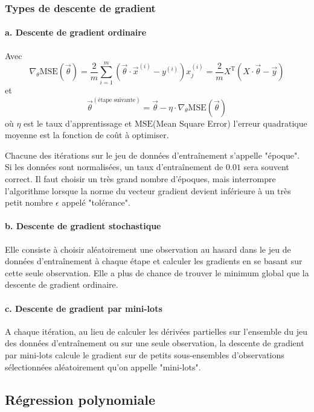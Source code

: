 \documentclass[a4paper,12pt,twoside]{report}
\theoremstyle{definition}
\theoremstyle{plain}
\theoremstyle{remark}
\begin{document}
\subsubsection{Types de descente de gradient}

\paragraph{a. Descente de gradient ordinaire}

Avec
\[ \nabla_\theta \mathrm{MSE}(\vec{\theta}) = \frac{2}{m} \sum_{i=1}^{m} (\vec{\theta} \cdot \vec{x}^{(i)} - y^{(i)}) x_j^{(i)} = \frac{2}{m} X^{\mathrm{T}} (X \cdot \vec{\theta} - \vec{y}) \]
et
\[ \vec{\theta}^{(\text{étape suivante})} = \vec{\theta} - \eta \cdot \nabla_\theta \mathrm{MSE}(\vec{\theta}) \]
où $\eta$ est le taux d'apprentissage et $\mathrm{MSE}$(Mean Square Error) l'erreur quadratique moyenne est la fonction de coût à optimiser.

Chacune des itérations sur le jeu de données d'entraînement s'appelle "époque". Si les données sont normalisées, un taux d'entraînement de $0.01$ sera souvent correct. Il faut choisir un très grand nombre d'époques, mais interrompre l'algorithme lorsque la norme du vecteur gradient devient inférieure à un très petit nombre $\epsilon$ appelé "tolérance".

\paragraph{b. Descente de gradient stochastique}

Elle consiste à choisir aléatoirement une observation au hasard dans le jeu de données d'entraînement à chaque étape et calculer les gradients en se basant sur cette seule observation. Elle a plus de chance de trouver le minimum global que la descente de gradient ordinaire.

\paragraph{c. Descente de gradient par mini-lots}

A chaque itération, au lieu de calculer les dérivées partielles sur l'ensemble du jeu des données d'entraînement ou sur une seule observation, la descente de gradient par mini-lots calcule le gradient sur de petits sous-ensembles d'observations sélectionnées aléatoirement qu'on appelle "mini-lots".

\subsection{Régression polynomiale}
\end{document}
